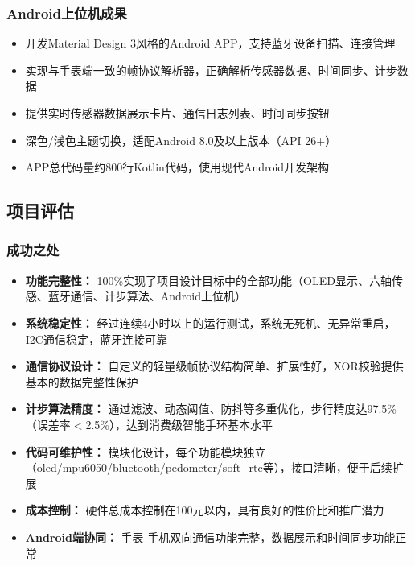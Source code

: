 \subsubsection{Android上位机成果}
\begin{itemize}
    \item 开发Material Design 3风格的Android APP，支持蓝牙设备扫描、连接管理
    \item 实现与手表端一致的帧协议解析器，正确解析传感器数据、时间同步、计步数据
    \item 提供实时传感器数据展示卡片、通信日志列表、时间同步按钮
    \item 深色/浅色主题切换，适配Android 8.0及以上版本（API 26+）
    \item APP总代码量约800行Kotlin代码，使用现代Android开发架构
\end{itemize}

\subsection{项目评估}

\subsubsection{成功之处}
\begin{itemize}
    \item \textbf{功能完整性：} 100\%实现了项目设计目标中的全部功能（OLED显示、六轴传感、蓝牙通信、计步算法、Android上位机）
    \item \textbf{系统稳定性：} 经过连续4小时以上的运行测试，系统无死机、无异常重启，I2C通信稳定，蓝牙连接可靠
    \item \textbf{通信协议设计：} 自定义的轻量级帧协议结构简单、扩展性好，XOR校验提供基本的数据完整性保护
    \item \textbf{计步算法精度：} 通过滤波、动态阈值、防抖等多重优化，步行精度达97.5\%（误差率$<$2.5\%），达到消费级智能手环基本水平
    \item \textbf{代码可维护性：} 模块化设计，每个功能模块独立（oled/mpu6050/bluetooth/pedometer/soft\_rtc等），接口清晰，便于后续扩展
    \item \textbf{成本控制：} 硬件总成本控制在100元以内，具有良好的性价比和推广潜力
    \item \textbf{Android端协同：} 手表-手机双向通信功能完整，数据展示和时间同步功能正常
\end{itemize}

